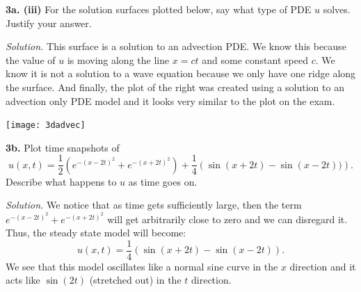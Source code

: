 \documentclass{article}
\begin{document}
\vspace{3mm}
\textbf{3a. (iii)} For the solution surfaces plotted below, say what type of PDE \(u\) solves. Justify your answer. 

\begin{multicols}{2}
\textit{Solution.} This surface is a solution to an advection PDE. We know this because the value of \(u\) is moving along the line \(x=ct\) and some constant speed \(c\). We know it is not a solution to a wave equation because we only have one ridge along the surface. And finally, the plot of the right was created using a solution to an advection only PDE model and it looks very similar to the plot on the exam. 

\begin{flushright}
\texttt{[image: 3dadvec]}
\end{flushright}
\end{multicols}


\vspace{3mm}
\textbf{3b.}  Plot time snapshots of 
\[
u(x,t) = \frac{1}{2} \left(e^{-(x-2t)^2} + e^{-(x+2t)^2} \right) + \frac{1}{4} \left( \sin(x+2t) - \sin(x-2t)) \right).
\]
Describe what happens to \(u\) as time goes on. 


\vspace{3mm}
\textit{Solution.} We notice that as time gets sufficiently large, then the term \( e^{-(x-2t)^2} + e^{-(x+2t)^2}\) will get arbitrarily close to zero and we can disregard it. Thus, the steady state model will become: 
\[
u(x,t) = \frac{1}{4} \left( \sin(x+2t) - \sin(x-2t) \right).
\]
We see that this model oscillates like a normal sine curve in the \(x\) direction and it acts like \(\sin(2t)\) (stretched out) in the \(t\) direction. 
\vspace{15mm}
\end{document}

